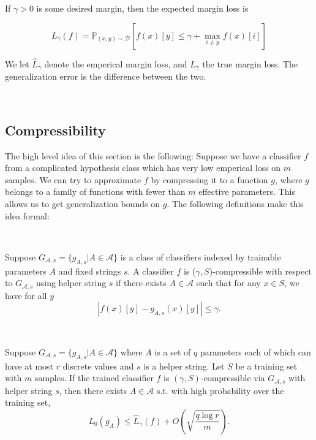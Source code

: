 If  $\gamma>0$ is some desired margin, then the expected margin loss is

$$
L_{\gamma}(f) = \mathbb{P}_{(x,y)\sim \mathcal{D}} \left[f(x)[y] \leq \gamma + \max_{i\neq y} f(x)[i]\right]
$$

We let $\hat{L}_{\gamma}$ denote the emperical margin loss, and $L_{\gamma}$ the true margin loss. The generalization error is the difference between the two. 

\ 

\subsection{Compressibility}

The high level idea of this section is the following: Suppose we have a classifier $f$ from a complicated hypothesis class which has very low emperical loss on $m$ samples. We can try to approximate $f$ by compressing it to a function $g$, where $g$ belongs to a family of functions with fewer than $m$ effective parameters. This allows us to get generalization bounds on $g$. The following definitions make this idea formal:

\

\begin{definition} Suppose $G_{\mathcal{A},s} =\{g_{A,s}|A\in \mathcal{A}\}$ is a class of classifiers indexed by trainable parameters $A$ and fixed strings $s$.  A classifier $f$ is  ($\gamma,S$)-compressible with respect to $G_{\mathcal{A},s}$ using helper string $s$ if there exists $A\in \mathcal{A}$ such that for any $x\in S$, we have for all $y$
\begin{equation}
    |f(x)[y] - g_{A,s}(x)[y]| \le \gamma.
\end{equation}

\end{definition}

\


\begin{theorem}\label{thrm21} Suppose $G_{\mathcal{A},s} =\{g_{A,s}|A\in \mathcal{A}\}$ where $A$ is a set of $q$ parameters each of which can have at most $r$ discrete values and $s$ is a helper string. Let $S$ be a training set with $m$ samples. If the trained classifier $f$ is $(\gamma,S)$-compressible via $G_{\mathcal{A},s}$ with helper string $s$, then there exists $A\in\mathcal{A}$ s.t. with high probability over the training set,
\begin{equation}
    L_0(g_A) \le \hat{L}_\gamma(f)+ O\left(\sqrt{\frac{q\log r}{m}}\right).
\end{equation}

\end{theorem}

